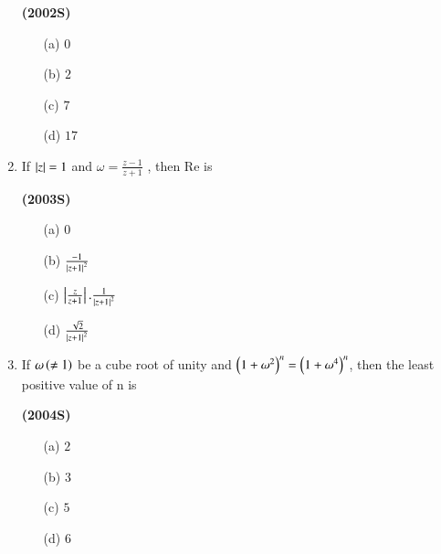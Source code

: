 \documentclass[journal,12pt,twocolumn]{IEEEtran}
\theoremstyle{remark}
\begin{document}
\begin{enumerate}[start=6]
\hfill{\textbf{(2002S)}}

\begin{enumerate}
\item[(a)]$0$
\item[(b)]$2$
\item[(c)]$7$
\item[(d)]$17$
\end{enumerate}
\item If $\left\vert z\right\vert=1$ and $\omega=\frac{z-1}{z+1}$ , then Re\brak{\omega} is

\hfill{\textbf{(2003S)}}

\begin{enumerate}
\item[(a)]$0$
\item[(b)]$\frac{-1}{\left\vert z+1\right\vert^2}$
\item[(c)]$\left\vert\frac{z}{z+1}\right\vert.\frac{1}{\left\vert z+1\right\vert^2}$
\item[(d)]$\frac{\sqrt{2}}{\left\vert z+1\right\vert^2}$
\end{enumerate}
\item If $\omega\left(\neq1\right)$ be a cube root of unity and $\left(1+\omega^2\right)^n = \left(1+\omega^4\right)^n$, then the least positive value of n is

\hfill{\textbf{(2004S)}}

\begin{enumerate}
\item[(a)]$2$
\item[(b)]$3$
\item[(c)]$5$
\item[(d)]$6$
\end{enumerate}
\end{enumerate}
\end{document}
